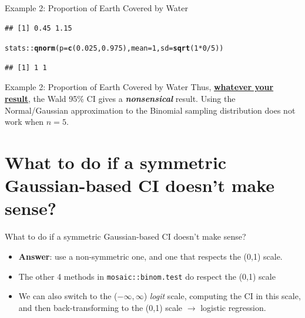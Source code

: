 \documentclass[10pt]{beamer}\usepackage[]{graphicx}\usepackage[]{color}
\makeatletter
\newcommand{\hlnum}[1]{\textcolor[rgb]{0.686,0.059,0.569}{#1}}%
\newcommand{\hlopt}[1]{\textcolor[rgb]{0,0,0}{#1}}%
\newcommand{\hlstd}[1]{\textcolor[rgb]{0.345,0.345,0.345}{#1}}%
\newcommand{\hlkwc}[1]{\textcolor[rgb]{0.333,0.667,0.333}{#1}}%
\newcommand{\hlkwd}[1]{\textcolor[rgb]{0.737,0.353,0.396}{\textbf{#1}}}%
\newenvironment{kframe}{%
 \def\at@end@of@kframe{}%
 \ifinner\ifhmode%
  \def\at@end@of@kframe{\end{minipage}}%
  \begin{minipage}{\columnwidth}%
 \fi\fi%
 \def\FrameCommand##1{\hskip\@totalleftmargin \hskip-\fboxsep
 \colorbox{shadecolor}{##1}\hskip-\fboxsep
     \hskip-\linewidth \hskip-\@totalleftmargin \hskip\columnwidth}%
 \MakeFramed {\advance\hsize-\width
   \@totalleftmargin\z@ \linewidth\hsize
   \@setminipage}}%
 {\par\unskip\endMakeFramed%
 \at@end@of@kframe}
\newenvironment{knitrout}{}{} %
\makeatother
\begin{document}
\begin{frame}[fragile]{Example 2: Proportion of Earth Covered by Water}
\begin{knitrout}
\begin{kframe}
\begin{alltt}
\end{alltt}
\begin{verbatim}
## [1] 0.45 1.15
\end{verbatim}
\begin{alltt}
\hlstd{stats}\hlopt{::}\hlkwd{qnorm}\hlstd{(}\hlkwc{p}\hlstd{=}\hlkwd{c}\hlstd{(}\hlnum{0.025}\hlstd{,}\hlnum{0.975}\hlstd{),} \hlkwc{mean} \hlstd{=} \hlnum{1}\hlstd{,} \hlkwc{sd} \hlstd{=} \hlkwd{sqrt}\hlstd{(}\hlnum{1} \hlopt{*} \hlnum{0} \hlopt{/} \hlnum{5}\hlstd{))}
\end{alltt}
\begin{verbatim}
## [1] 1 1
\end{verbatim}
\end{kframe}
\end{knitrout}
	
	
\end{frame}



\begin{frame}{Example 2: Proportion of Earth Covered by Water}
	Thus, \textbf{\underline{whatever your result}}, the Wald 95\% CI gives a \textit{\textbf{nonsensical}} result. Using the Normal/Gaussian approximation to the Binomial sampling distribution does not work when $n=5.$
\end{frame}


\section{What to do if a symmetric Gaussian-based CI doesn't make sense?}


\begin{frame}{What to do if a symmetric Gaussian-based CI doesn't make sense?}
	\begin{itemize}
		\setlength\itemsep{1em}
		\item \textbf{Answer}: use a non-symmetric one, and one that respects the (0,1) scale. \pause 
		\item The other 4 methods in \texttt{mosaic::binom.test} do respect the (0,1) scale \pause 
		\item We can also switch to the ($-\infty, \infty$)  \textit{logit} scale, computing the CI in this scale, and then back-transforming to the (0,1) scale $\to$ logistic regression.
	\end{itemize}
\end{frame}
\end{document}
